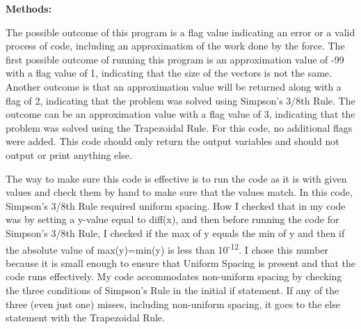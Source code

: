 \documentclass{article}
\begin{document}
{\bf Methods:} {\color{black}       The possible outcome of this program is a flag value indicating an error or a valid process of code, including an approximation of the work done by the force.  The first possible outcome of running this program is an approximation value of -99 with a flag value of 1, indicating that the size of the vectors is not the same.  Another outcome is that an approximation value will be returned along with a flag of 2, indicating that the problem was solved using Simpson’s 3/8th Rule.  The outcome can be an approximation value with a flag value of 3, indicating that the problem was solved using the Trapezoidal Rule. For this code, no additional flags were added.  This code should only return the output variables and should not output or print anything else.  
\par \bigskip \par
The way to make sure this code is effective is to run the code as it is with given values and check them by hand to make sure that the values match.  In this code, Simpson’s 3/8th Rule required uniform spacing.  How I checked that in my code was by setting a y-value equal to diff(x), and then before running the code for Simpson’s 3/8th Rule, I checked if the max of y equals the min of y and then if the absolute value of max(y)=min(y) is less than 10\textsuperscript{-12}. I chose this number because it is small enough to ensure that Uniform Spacing is present and that the code runs effectively.  My code accommodates non-uniform spacing by checking the three conditions of Simpson’s Rule in the initial if statement. If any of the three (even just one) misses, including non-uniform spacing, it goes to the else statement with the Trapezoidal Rule.
 }
\par \bigskip \par
\end{document}
